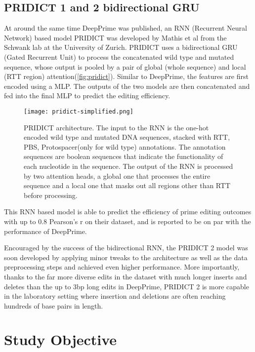 \subsection{PRIDICT 1 and 2 bidirectional GRU}

At around the same time DeepPrime was published, an RNN (Recurrent Neural Network) based model PRIDICT was developed by Mathis et al from the Schwank lab at the University of Zurich\cite{mathisPredictingPrimeEditing2023}. PRIDICT uses a bidirectional GRU (Gated Recurrent Unit) to process the concatenated wild type and mutated sequence, whose output is pooled by a pair of global (whole sequence) and local (RTT region) attention(\autoref{fig:pridict}). Similar to DeepPrime, the features are first encoded using a MLP. The outputs of the two models are then concatenated and fed into the final MLP to predict the editing efficiency.

\begin{figure}
    \centering
    \texttt{[image: pridict-simplified.png]}
    \caption[PRIDICT architecture]{PRIDICT architecture. The input to the RNN is the one-hot encoded wild type and mutated DNA sequences, stacked with RTT, PBS, Protospacer(only for wild type) annotations. The annotation sequences are boolean sequences that indicate the functionality of each nucleotide in the sequence. The output of the RNN is processed by two attention heads, a global one that processes the entire sequence and a local one that masks out all regions other than RTT before processing.}
    \label{fig:pridict}
\end{figure}

This RNN based model is able to predict the efficiency of prime editing outcomes with up to 0.8 Pearson's r on their dataset, and is reported to be on par with the performance of DeepPrime.

Encouraged by the success of the bidirectional RNN, the PRIDICT 2 model was soon developed by applying minor tweaks to the architecture as well as the data preprocessing steps and achieved even higher performance\cite{mathisMachineLearningPrediction2024}. More importantly, thanks to the far more diverse edits in the dataset with much longer inserts and deletes than the up to 3bp long edits in DeepPrime, PRIDICT 2 is more capable in the laboratory setting where insertion and deletions are often reaching hundreds of base pairs in length\cite{liuPrimeEditingPrecise2023}.

\section{Study Objective}

